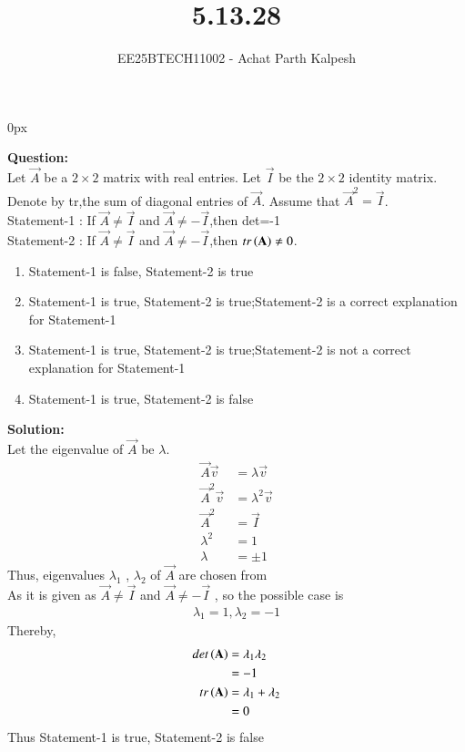 \documentclass[journal]{IEEEtran}
\begin{document}

\title{5.13.28}
\author{EE25BTECH11002 - Achat Parth Kalpesh }
{\let\newpage\relax\maketitle}
\renewcommand{\thefigure}{\theenumi}
\renewcommand{\thetable}{\theenumi}
\setlength{\intextsep}{10pt} %
\renewcommand{\thetable}{\theenumi}
\parindent 0px


\textbf{Question:}\\
 Let $\vec{A}$ be a $2 \times 2$ matrix with real entries. Let 
 $\vec{I}$ be the $2 \times 2$ identity matrix. Denote by 
 tr,the sum of diagonal entries of $\vec{A}$. Assume
 that $\vec{A}^2 = \vec{I}$. \\
		Statement-1 : If $\vec{A} \neq \vec{I}$ and $\vec{A} \neq -
        \vec{I}$,then det=-1 \\
		Statement-2 : If $\vec{A} \neq \vec{I}$ and $\vec{A} \neq -
        \vec{I}$,then $tr\left(\mathbf{A}\right) \neq 0$.
		\begin{enumerate}
			\item Statement-1 is false, Statement-2 is true
			\item Statement-1 is true, Statement-2 is 
            true;Statement-2 is a correct explanation for 
            Statement-1
			\item Statement-1 is true, Statement-2 is 
            true;Statement-2 is not a correct explanation for 
            Statement-1
			\item Statement-1 is true, Statement-2 is false
		\end{enumerate}

\textbf{Solution:}\\
Let the eigenvalue of  $\vec{A}$  be  $\lambda$.
\begin{align}
    \vec{A}\vec{v} &= \lambda \vec{v} \\
    \vec{A}^2 \vec{v} &= \lambda^2 \vec{v}\\
    \vec{A}^2 &= \vec{I}\\
    \lambda^2 &= 1 \\
    \lambda &= \pm 1
\end{align}
Thus, eigenvalues $\lambda_1$ , $\lambda_2$ of  $\vec{A}$  are chosen from  \\
As it is given as $\vec{A} \neq \vec{I}$ and $\vec{A} \neq -\vec{I}$ , so the possible case is
\begin{align}
    \lambda_1 = 1,\lambda_2 = -1
\end{align}
Thereby,
\begin{align}
    det\left(\mathbf{A}\right) &= \lambda_1 \lambda_2\\
    &= -1 \\
    tr\left(\mathbf{A}\right) &= \lambda_1 + \lambda_2 \\
    &= 0
\end{align}
Thus Statement-1 is true, Statement-2 is false
\end{document}
